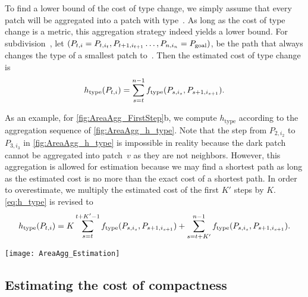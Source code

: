 To find a lower bound of the cost of type change, 
we simply assume that 
every patch will be aggregated into a patch with type~\Tgoal.
As long as the cost of type change is a metric, this aggregation 
strategy indeed yields a lower bound.
%
For subdivision~\Pnode, let
$(P_{t,i}=P_{t,i_t}, P_{t+1,i_{t+1}} \dots,P_{n,i_n}=P_\mathrm{goal})$,
be the path that always changes the type of a smallest patch 
to~\Tgoal.
Then the estimated cost of type change is
\begin{equation}
\label{eq:h_type}
h_\mathrm{type}(P_{t,i})=
\sum_{s=t}^{n-1}f_\mathrm{type}(P_{s,i_s},P_{s+1,i_{s+1}}).
\end{equation}

As an example, for \fig\ref{fig:AreaAgg_FirstStep}b, we compute 
$h_\mathrm{type}$ 
according to the aggregation sequence of 
\fig\ref{fig:AreaAgg_h_type}.
Note that the step from $P_{2,i_2}$ to 
$P_{3,i_3}$ 
in 
\fig\ref{fig:AreaAgg_h_type} is impossible in reality 
because the dark patch cannot be aggregated into patch~$v$
as they are not neighbors. 
However, this aggregation is allowed for estimation 
because we may find a shortest path as long as 
the estimated cost is no more than 
the exact cost of a shortest path.
In order to overestimate, we multiply the estimated cost of the 
first $K'$ steps by $K$.
\fo\ref{eq:h_type} is revised to
\begin{equation}
\label{eq:o_type}
h_\mathrm{type}(P_{t,i})=
K\sum_{s=t}^{t+K'-1}f_\mathrm{type}(P_{s,i_s},P_{s+1,i_{s+1}})+
\sum_{s=t+K'}^{n-1}f_\mathrm{type}(P_{s,i_s},P_{s+1,i_{s+1}}).
\nonumber
\end{equation}


\begin{figure*}[tb]
\centering
\texttt{[image: AreaAgg\_Estimation]}
\caption{An ``aggregation sequence'' for computing 
	$h_{\mathrm{type}}$, 
	based on the aggregation result of 
	\fig\ref{fig:AreaAgg_FirstStep}b}
\label{fig:AreaAgg_h_type}
\end{figure*}


\subsection{Estimating the cost of compactness}
\label{sec:AreaAgg_h_comp}

